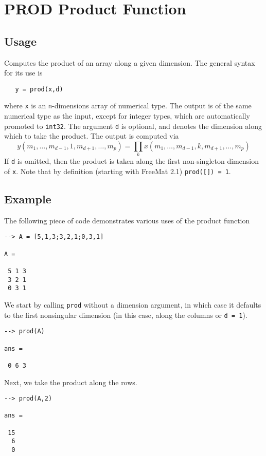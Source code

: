 \section{PROD Product Function}

\subsection{Usage}

Computes the product of an array along a given dimension.  The general
syntax for its use is
\begin{verbatim}
   y = prod(x,d)
\end{verbatim}
where \verb|x| is an \verb|n|-dimensions array of numerical type.
The output is of the same numerical type as the input, except 
for integer types, which are automatically promoted to \verb|int32|.
 The argument \verb|d| is optional, and denotes the dimension along 
which to take the product.  The output is computed via
\[
  y(m_1,\ldots,m_{d-1},1,m_{d+1},\ldots,m_{p}) = 
    \prod_{k} x(m_1,\ldots,m_{d-1},k,m_{d+1},\ldots,m_{p})
\]
If \verb|d| is omitted, then the product is taken along the 
first non-singleton dimension of \verb|x|. Note that by definition
(starting with FreeMat 2.1) \verb|prod([]) = 1|.
\subsection{Example}

The following piece of code demonstrates various uses of the product
function
\begin{verbatim}
--> A = [5,1,3;3,2,1;0,3,1]

A = 

 5 1 3 
 3 2 1 
 0 3 1 
\end{verbatim}
We start by calling \verb|prod| without a dimension argument, in which case it defaults to the first nonsingular dimension (in this case, along the columns or \verb|d = 1|).
\begin{verbatim}
--> prod(A)

ans = 

 0 6 3 
\end{verbatim}
Next, we take the product along the rows.
\begin{verbatim}
--> prod(A,2)

ans = 

 15 
  6 
  0 
\end{verbatim}
